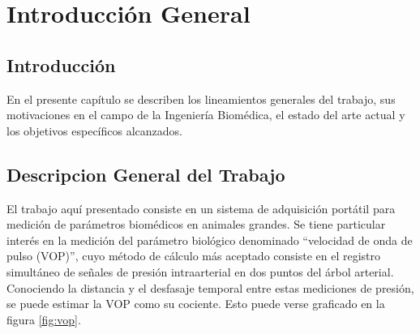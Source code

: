 
\chapter{Introducción General} %

\label{Chapter1} %
\label{IntroGeneral}


\newcommand{\keyword}[1]{\textbf{#1}}
\newcommand{\tabhead}[1]{\textbf{#1}}
\newcommand{\code}[1]{\texttt{#1}}
\newcommand{\file}[1]{\texttt{\bfseries#1}}
\newcommand{\option}[1]{\texttt{\itshape#1}}
\newcommand{\grados}{$^{\circ}$}


\section{Introducción}

En el presente capítulo se describen los lineamientos generales del trabajo, sus motivaciones en el campo de la Ingeniería Biomédica, el estado del arte actual y los objetivos específicos alcanzados.


\section{Descripcion General del Trabajo}

El trabajo aquí presentado consiste en un sistema de adquisición portátil para medición de parámetros biomédicos en animales grandes. Se tiene particular interés en la medición del parámetro biológico denominado \enquote{velocidad de onda de pulso (VOP)}, cuyo método de cálculo más aceptado consiste en el registro simultáneo de señales de presión intraarterial en dos puntos del árbol arterial. Conociendo la distancia y el desfasaje temporal entre estas mediciones de presión, se puede estimar la VOP como su cociente. Esto puede verse graficado en la figura \ref{fig:vop}.

